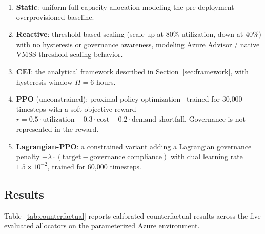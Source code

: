 \documentclass[runningheads]{llncs}
\begin{document}
\begin{enumerate}
\item \textbf{Static}: uniform full-capacity allocation modeling the pre-deployment overprovisioned baseline.
\item \textbf{Reactive}: threshold-based scaling (scale up at 80\% utilization, down at 40\%) with no hysteresis or governance awareness, modeling Azure Advisor / native VMSS threshold scaling behavior.
\item \textbf{CEI}: the analytical framework described in Section~\ref{sec:framework}, with hysteresis window $H = 6$ hours.
\item \textbf{PPO} (unconstrained): proximal policy optimization~\cite{schulman} trained for 30{,}000 timesteps with a soft-objective reward $r = 0.5 \cdot \text{utilization} - 0.3 \cdot \text{cost} - 0.2 \cdot \text{demand-shortfall}$. Governance is not represented in the reward.
\item \textbf{Lagrangian-PPO}: a constrained variant adding a Lagrangian governance penalty $-\lambda \cdot (\text{target} - \text{governance\_compliance})$ with dual learning rate $1.5 \times 10^{-2}$, trained for 60{,}000 timesteps.
\end{enumerate}

\subsection{Results}

Table~\ref{tab:counterfactual} reports calibrated counterfactual results across the five evaluated allocators on the parameterized Azure environment.
\end{document}
